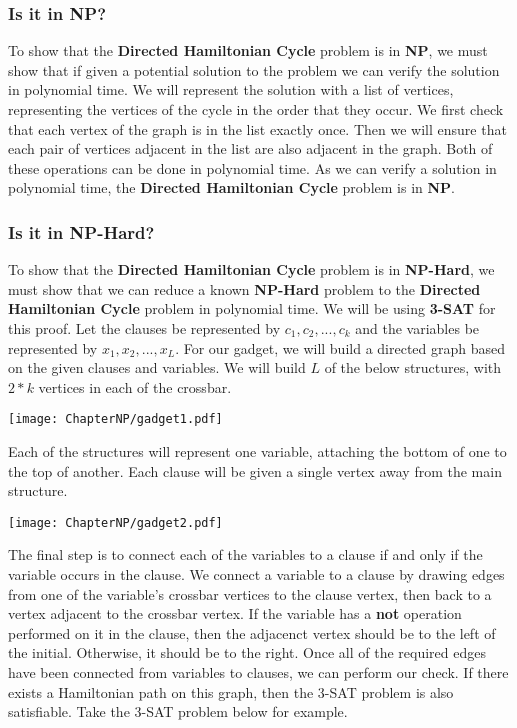     \subsubsection{Is it in NP?}
        To show that the \textbf{Directed Hamiltonian Cycle} problem is in \textbf{NP}, we must show that if given a potential solution to the problem we can verify the solution in polynomial time. We will represent the solution with a list of vertices, representing the vertices of the cycle in the order that they occur. We first check that each vertex of the graph is in the list exactly once. Then we will ensure that each pair of vertices adjacent in the list are also adjacent in the graph. Both of these operations can be done in polynomial time. As we can verify a solution in polynomial time, the \textbf{Directed Hamiltonian Cycle} problem is in \textbf{NP}.
    \subsubsection{Is it in NP-Hard?}
        To show that the \textbf{Directed Hamiltonian Cycle} problem is in \textbf{NP-Hard}, we must show that we can reduce a known \textbf{NP-Hard} problem to the \textbf{Directed Hamiltonian Cycle} problem in polynomial time. We will be using \textbf{3-SAT} for this proof. Let the clauses be represented by $c_1, c_2, ..., c_k$ and the variables be represented by $x_1, x_2, ..., x_L$. For our gadget, we will build a directed graph based on the given clauses and variables. We will build $L$ of the below structures, with $2*k$ vertices in each of the crossbar. 
        \begin{center}
            \texttt{[image: ChapterNP/gadget1.pdf]}
        \end{center}
        Each of the structures will represent one variable, attaching the bottom of one to the top of another. Each clause will be given a single vertex away from the main structure.
        \begin{center}
            \texttt{[image: ChapterNP/gadget2.pdf]}
        \end{center}
        The final step is to connect each of the variables to a clause if and only if the variable occurs in the clause. We connect a variable to a clause by drawing edges from one of the variable's crossbar vertices to the clause vertex, then back to a vertex adjacent to the crossbar vertex. If the variable has a \textbf{not} operation performed on it in the clause, then the adjacenct vertex should be to the left of the initial. Otherwise, it should be to the right. Once all of the required edges have been connected from variables to clauses, we can perform our check. If there exists a Hamiltonian path on this graph, then the 3-SAT problem is also satisfiable. Take the 3-SAT problem below for example.
